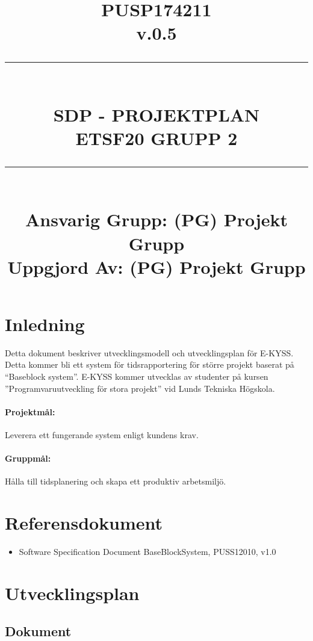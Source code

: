 \documentclass[paper=a4, fontsize=11pt,twoside]{article}
\title{
		\documentNumber{#1}																						
		\documentVersion{#2}																				
		\HRule{0.5pt} \\ %
		\LARGE \textbf{\uppercase{#3}} \\
		\large \textbf{\uppercase{ETSF20 Grupp 2}} 
		\HRule{2pt} \\ [1.5cm]    
		\normalsize            
		\documentResponsible{#4} \\ 
		\documentCreator{#4}  
	}
\newcommand{\HRule}[1]{\rule{\linewidth}{#1}}
\newcommand{\documentNumber}[1]{\centering PUSP1742#1 \\[1.0cm]}
\newcommand{\documentVersion}[1]{\centering \small{v.#1} \\[1.0cm]}
\newcommand{\documentResponsible}[1]{\centering  Ansvarig Grupp: #1}
\newcommand{\documentCreator}[1]{\centering Uppgjord Av: #1}
\newcommand{\grouptitlepage}[4]{ 
	\title{
		\documentNumber{#1}																						
		\documentVersion{#2}																				
		\HRule{0.5pt} \\ %
		\LARGE \textbf{\uppercase{#3}} \\
		\large \textbf{\uppercase{ETSF20 Grupp 2}} 
		\HRule{2pt} \\ [1.5cm]    
		\normalsize            
		\documentResponsible{#4} \\ 
		\documentCreator{#4}  
	}																							
	\maketitle																							
	\thispagestyle{empty} 																					
	\newpage 
}
\begin{document}
\grouptitlepage
{11}
{0.5}
{SDP - Projektplan}
{(PG) Projekt Grupp}	
\tableofcontents
\section{Inledning}
Detta dokument beskriver utvecklingsmodell och utvecklingsplan för E-KYSS. Detta kommer bli ett system för tidsrapportering för större projekt baserat på ``Baseblock system''. E-KYSS kommer utvecklas av studenter på kursen ''Programvaruutveckling för stora projekt'' vid Lunds Tekniska Högskola.
\paragraph{Projektmål:} Leverera ett fungerande system enligt kundens krav.
\paragraph{Gruppmål:} Hålla till tidsplanering och skapa ett produktiv arbetsmiljö.

\section{Referensdokument}
\begin{itemize}
\item Software Specification Document BaseBlockSystem, PUSS12010, v1.0
\end{itemize}
\section{Utvecklingsplan}

\subsection*{Dokument}
\end{document}
